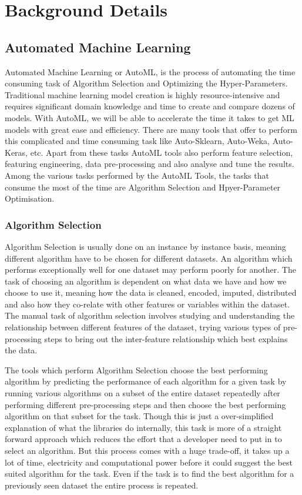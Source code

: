 \chapter{Background Details}

\section{Automated Machine Learning}
Automated Machine Learning or AutoML, is the process of automating the time consuming task of Algorithm Selection and Optimizing the Hyper-Parameters. Traditional machine learning model creation is highly resource-intensive and requires significant domain knowledge and time to create and compare dozens of models. With AutoML, we will be able to accelerate the time it takes to get ML models with great ease and efficiency. There are many tools that offer to perform this complicated and time consuming task like Auto-Sklearn, Auto-Weka, Auto-Keras, etc. Apart from these tasks AutoML tools also perform feature selection, featuring engineering, data pre-processing and also analyse and tune the results. Among the various tasks performed by the AutoML Tools, the tasks that consume the most of the time are Algorithm Selection and Hpyer-Parameter Optimisation. 

\subsection{Algorithm Selection}
Algorithm Selection is usually done on an instance by instance basis, meaning different algorithm have to be chosen for different datasets. An algorithm which performs exceptionally well for one dataset may perform poorly for another. The task of choosing an algorithm is dependent on what data we have and how we choose to use it, meaning how the data is cleaned, encoded, imputed, distributed and also how they co-relate with other features or variables within the dataset. The manual task of algorithm selection involves studying and understanding the relationship between different features of the dataset, trying various types of pre-processing steps to bring out the inter-feature relationship which best explains the data. 

The tools which perform Algorithm Selection choose the best performing algorithm by predicting the performance of each algorithm for a given task by running various algorithms on a subset of the entire dataset repeatedly after performing different pre-processing steps and then choose the best performing algorithm on that subset for the task. Though this is just a over-simplified explanation of what the libraries do internally, this task is more of a straight forward approach which reduces the effort that a developer need to put in to select an algorithm. But this process comes with a huge trade-off, it takes up a lot of time, electricity and computational power before it could suggest the best suited algorithm for the task. Even if the task is to find the best algorithm for a previously seen dataset the entire process is repeated.

